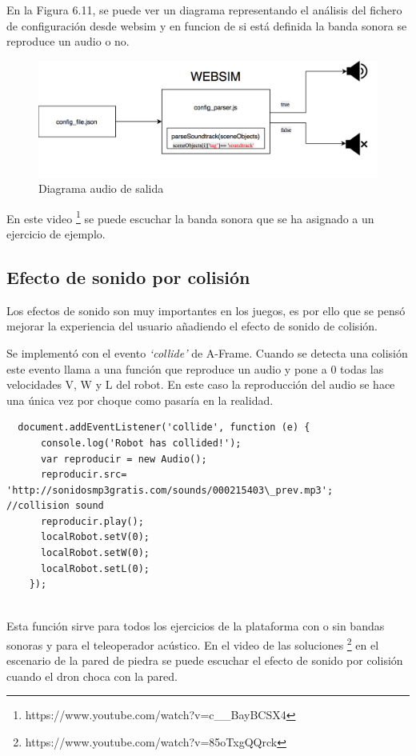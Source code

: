 En la Figura 6.11, se puede ver un diagrama representando el análisis del fichero de configuración desde websim y en funcion de si está definida la banda sonora se reproduce un audio o no. 
\begin{figure}[H]
    \centering
    \includegraphics[width=1\textwidth, height=0.3\textwidth]{chapters/images/diagramaaudioout.png}
    \caption{Diagrama audio de salida}
    \label{fig:my_label}
\end{figure}

En este video \footnote{https://www.youtube.com/watch?v=c\_\_BayBCSX4} se puede escuchar la banda sonora que se ha asignado a un ejercicio de ejemplo.

\subsection{Efecto de sonido por colisión }

Los efectos de sonido son muy importantes en los juegos, es por ello que se pensó mejorar la experiencia del usuario añadiendo el efecto de sonido de colisión. 

Se implementó con el evento \textit{`collide'} de A-Frame. Cuando se detecta una colisión este evento llama a una función que reproduce un audio y pone a 0 todas las velocidades V, W y L del robot.  En este caso la reproducción del audio se hace una única vez por choque como pasaría en la realidad.

\begin{lstlisting}
  document.addEventListener('collide', function (e) {
      console.log('Robot has collided!');
      var reproducir = new Audio();
      reproducir.src= 'http://sonidosmp3gratis.com/sounds/000215403\_prev.mp3';   //collision sound
      reproducir.play();
      localRobot.setV(0);
      localRobot.setW(0);
      localRobot.setL(0);
	});
	
\end{lstlisting}

Esta función sirve para todos los ejercicios de la plataforma con o sin  bandas sonoras y para el teleoperador acústico. En el video de las soluciones  \footnote{https://www.youtube.com/watch?v=85oTxgQQrck}  en el escenario de la pared de piedra se puede escuchar el efecto de sonido por colisión cuando el dron choca con la pared.